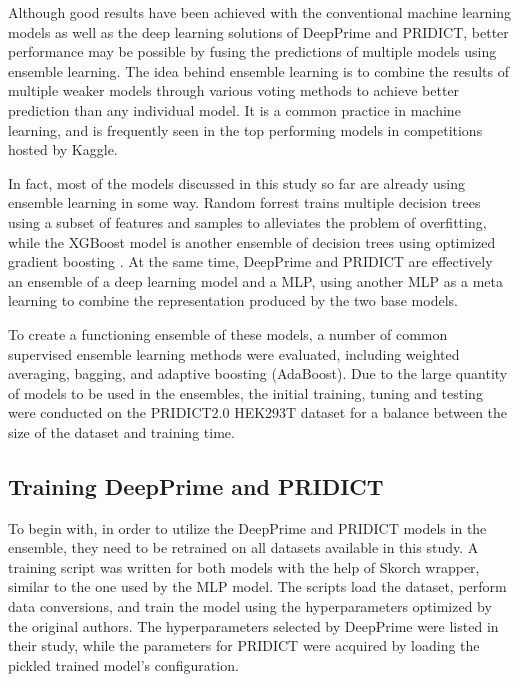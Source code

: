 Although good results have been achieved with the conventional machine learning models as well as the deep learning solutions of DeepPrime and PRIDICT, better performance may be possible by fusing the predictions of multiple models using ensemble learning.
The idea behind ensemble learning is to combine the results of multiple weaker models through various voting methods to achieve better prediction than any individual model. It is a common practice in machine learning, and is frequently seen in the top performing models in competitions hosted by Kaggle\cite{dongSurveyEnsembleLearning2020}. 

In fact, most of the models discussed in this study so far are already using ensemble learning in some way. Random forrest trains multiple decision trees using a subset of features and samples to alleviates the problem of overfitting, while the XGBoost model is another ensemble of decision trees using optimized gradient boosting \cite{chenXGBoostScalableTree2016}. At the same time, DeepPrime and PRIDICT are effectively an ensemble of a deep learning model and a MLP, using another MLP as a meta learning to combine the representation produced by the two base models. 

To create a functioning ensemble of these models, a number of common supervised ensemble learning methods were evaluated, including weighted averaging, bagging, and adaptive boosting (AdaBoost). Due to the large quantity of models to be used in the ensembles, the initial training, tuning and testing were conducted on the PRIDICT2.0 HEK293T dataset for a balance between the size of the dataset and training time. 


\subsection{Training DeepPrime and PRIDICT}
\label{sec:training-deepprime-pridict}

To begin with, in order to utilize the DeepPrime and PRIDICT models in the ensemble, they need to be retrained on all datasets available in this study. A training script was written for both models with the help of Skorch wrapper, similar to the one used by the MLP model. The scripts load the dataset, perform data conversions, and train the model using the hyperparameters optimized by the original authors. The hyperparameters selected by DeepPrime were listed in their study, while the parameters for PRIDICT were acquired by loading the pickled trained model's configuration. 

